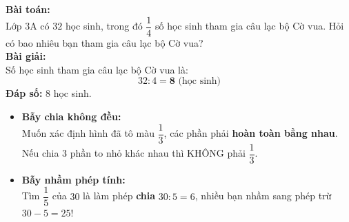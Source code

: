 \documentclass[12pt,a4paper]{article}
\begin{document}
\vspace{-2.5mm}
\noindent
\begin{minipage}[t]{0.49\textwidth}\vspace{0pt}
\begin{tcolorbox}[
  enhanced,
  colback=green!4!white,
  colframe=green!60!black,
  arc=2mm, boxrule=0.8pt,
  left=2mm, right=2mm, top=1.8mm, bottom=1.8mm,
  title={\footnotesize\bfseries\color{white}\faCheckCircle\ Ví dụ thực hành chuẩn mực}
]
{\footnotesize
\textbf{Bài toán:}\\
Lớp 3A có $32$ học sinh, trong đó $\dfrac{1}{4}$ số học sinh tham gia câu lạc bộ Cờ vua. Hỏi có bao nhiêu bạn tham gia câu lạc bộ Cờ vua?\\
\textbf{Bài giải:}\\
Số học sinh tham gia câu lạc bộ Cờ vua là:
$$32 : 4 = \mathbf{8}\text{ (học sinh)}$$
\textbf{Đáp số:} $8$ học sinh.
}
\end{tcolorbox}
\end{minipage}
\hfill
\begin{minipage}[t]{0.49\textwidth}\vspace{0pt}
\begin{tcolorbox}[
  enhanced,
  colback=red!4!white,
  colframe=red!70!black,
  arc=2mm, boxrule=0.8pt,
  left=2mm, right=2mm, top=1.8mm, bottom=1.8mm,
  title={\footnotesize\bfseries\color{white}\faExclamationTriangle\ Mẹo tránh bẫy trắc nghiệm}
]
{\footnotesize
\begin{itemize}\setlength{\itemsep}{1.5pt}\setlength{\leftskip}{-2.5mm}
  \item \textbf{Bẫy chia không đều:}\\
  Muốn xác định hình đã tô màu $\dfrac{1}{3}$, các phần phải \textbf{hoàn toàn bằng nhau}. Nếu chia 3 phần to nhỏ khác nhau thì KHÔNG phải $\dfrac{1}{3}$.
  \item \textbf{Bẫy nhầm phép tính:}\\
  Tìm $\dfrac{1}{5}$ của $30$ là làm phép \textbf{chia} $30 : 5 = 6$, nhiều bạn nhầm sang phép trừ $30 - 5 = 25$!
\end{itemize}
}
\end{tcolorbox}
\end{minipage}
\end{document}

